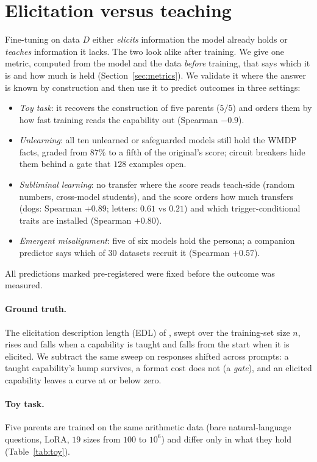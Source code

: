 \documentclass[11pt]{article}
\theoremstyle{definition}
\begin{document}
\section{Elicitation versus teaching}
\label{sec:evt}

Fine-tuning on data $D$ either \emph{elicits} information the model already holds or \emph{teaches} information it
lacks. The two look alike after training. We give one metric, computed from the model and the data \emph{before}
training, that says which it is and how much is held (Section~\ref{sec:metrics}). We validate it where the answer is
known by construction and then use it to predict outcomes in three settings:
\begin{itemize}[leftmargin=*,nosep]
\item \emph{Toy task}: it recovers the construction of five parents ($5/5$) and orders them by how fast training
  reads the capability out (Spearman $-0.9$).
\item \emph{Unlearning}: all ten unlearned or safeguarded models still hold the WMDP facts, graded from $87\%$
  to a fifth of the original's score; circuit breakers hide them behind a gate that $128$ examples open.
\item \emph{Subliminal learning}: no transfer where the score reads teach-side (random numbers, cross-model
  students), and the score orders how much transfers (dogs: Spearman $+0.89$; letters: $0.61$ vs $0.21$) and
  which trigger-conditional traits are installed (Spearman $+0.80$).
\item \emph{Emergent misalignment}: five of six models hold the persona; a companion predictor says which of $30$
  datasets recruit it (Spearman $+0.57$).
\end{itemize}
All predictions marked pre-registered were fixed before the outcome was measured.

\paragraph{Ground truth.} The elicitation description length (EDL) of \citet{donoway2026bits}, swept over the
training-set size $n$, rises and falls when a capability is taught and falls from the start when it is elicited. We
subtract the same sweep on responses shifted across prompts: a taught capability's hump survives, a format cost does
not (a \emph{gate}), and an elicited capability leaves a curve at or below zero.

\paragraph{Toy task.} Five parents are trained on the same arithmetic data (bare natural-language questions,
LoRA, $19$ sizes from $100$ to $10^6$) and differ only in what they hold (Table~\ref{tab:toy}).
\end{document}
